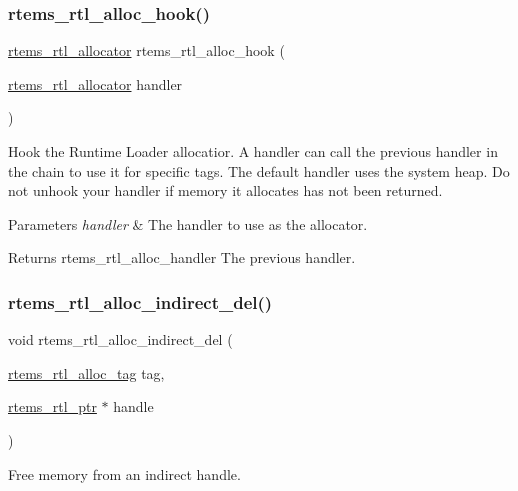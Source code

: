 \subsubsection{\texorpdfstring{rtems\_rtl\_alloc\_hook()}{rtems\_rtl\_alloc\_hook()}}
{\footnotesize\ttfamily \mbox{\hyperlink{rtl-allocator_8h_aa8af44a7337cfbfe72b669c82a604bb7}{rtems\+\_\+rtl\+\_\+allocator}} rtems\+\_\+rtl\+\_\+alloc\+\_\+hook (\begin{DoxyParamCaption}\item[{\mbox{\hyperlink{rtl-allocator_8h_aa8af44a7337cfbfe72b669c82a604bb7}{rtems\+\_\+rtl\+\_\+allocator}}}]{handler }\end{DoxyParamCaption})}

Hook the Runtime Loader allocatior. A handler can call the previous handler in the chain to use it for specific tags. The default handler uses the system heap. Do not unhook your handler if memory it allocates has not been returned.


\begin{DoxyParams}{Parameters}
{\em handler} & The handler to use as the allocator. \\
\hline
\end{DoxyParams}
\begin{DoxyReturn}{Returns}
rtems\+\_\+rtl\+\_\+alloc\+\_\+handler The previous handler. 
\end{DoxyReturn}
\mbox{\label{rtl-allocator_8c_ad8518f137454a1a316fc21d335af10c9}} 
\subsubsection{\texorpdfstring{rtems\_rtl\_alloc\_indirect\_del()}{rtems\_rtl\_alloc\_indirect\_del()}}
{\footnotesize\ttfamily void rtems\+\_\+rtl\+\_\+alloc\+\_\+indirect\+\_\+del (\begin{DoxyParamCaption}\item[{\mbox{\hyperlink{rtl-allocator_8h_a445a8615118b7fc14005ab20583153fd}{rtems\+\_\+rtl\+\_\+alloc\+\_\+tag}}}]{tag,  }\item[{\mbox{\hyperlink{structrtems__rtl__ptr}{rtems\+\_\+rtl\+\_\+ptr}} $\ast$}]{handle }\end{DoxyParamCaption})}

Free memory from an indirect handle.


